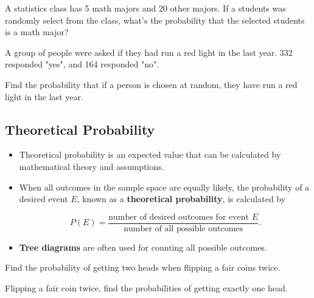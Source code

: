 \begin{example}

A statistics class has 5 math majors and 20 other majors. If a students
was randomly select from the class, what's the probability that the
selected students is a math major?

\end{example}
\vspace*{4\baselineskip}

\begin{exercise}

  A group of people were asked if they had run a red light in the last year. 332 responded "yes", and 164 responded "no".

  Find the probability that if a person is chosen at random, they have run a red light in the last year.

\end{exercise}
\vspace*{4\baselineskip}

\hypertarget{theoretical-probability}{%
\subsection{Theoretical Probability}\label{theoretical-probability}}

\begin{itemize}
\item
  Theoretical probability is an expected value that can be calculated by
  mathematical theory and assumptions.
\item
  When all outcomes in the sample space are equally likely, the
  probability of a desired event \(E\), known as a \textbf{theoretical
  probability}, is calculated by

  \[
  P(E)=\dfrac{\text{number of desired outcomes for event }E}{\text{number of all possible outcomes}}.
  \]
\item
  \textbf{Tree diagrams} are often used for counting all possible
  outcomes.
\end{itemize}

\begin{example}

Find the probability of getting two heads when flipping a fair coins
twice.

\end{example}
\vspace*{5\baselineskip}


\begin{exercise}

  Flipping a fair coin twice, find the probabilities of getting exactly
  one head.
  
\end{exercise}
\vspace*{5\baselineskip}

